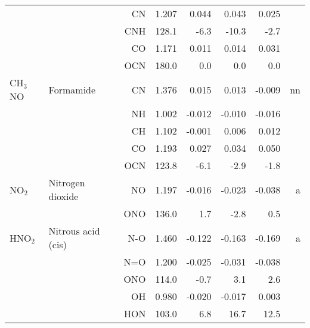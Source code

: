 \begin{table}
\begin{center}
\begin{tabular}{llrrrrrr}
             &                                    &CN            &     1.207   &     0.044 &     0.043 &     0.025 &       \\
             &                                    &CNH         &     128.1   &      -6.3 &     -10.3 &      -2.7   &       \\
             &                                    &CO            &     1.171   &     0.011 &     0.014 &     0.031 &       \\
             &                                    &OCN         &     180.0   &       0.0 &       0.0 &       0.0   &       \\
 CH$_3$NO       & Formamide                          &CN            &     1.376   &     0.015 &     0.013 &    -0.009 &    nn \\
             &                                    &NH            &     1.002   &    -0.012 &    -0.010 &    -0.016 &       \\
             &                                    &CH            &     1.102   &    -0.001 &     0.006 &     0.012 &       \\
             &                                    &CO            &     1.193   &     0.027 &     0.034 &     0.050 &       \\
             &                                    &OCN         &     123.8   &      -6.1 &      -2.9 &      -1.8   &       \\
 NO$_2$         & Nitrogen dioxide                   &NO            &     1.197   &    -0.016 &    -0.023 &    -0.038 &     a \\
             &                                    &ONO         &     136.0   &       1.7 &      -2.8 &       0.5   &       \\
 HNO$_2$        & Nitrous acid (cis)                 &N-O           &     1.460   &    -0.122 &    -0.163 &    -0.169 &     a \\
             &                                    &N=O           &     1.200   &    -0.025 &    -0.031 &    -0.038 &       \\
             &                                    &ONO         &     114.0   &      -0.7 &       3.1 &       2.6   &       \\
             &                                    &OH            &     0.980   &    -0.020 &    -0.017 &     0.003 &       \\
             &                                    &HON         &     103.0   &       6.8 &      16.7 &      12.5   &       \\

\end{tabular}
\end{center}
\end{table}
